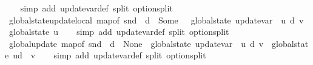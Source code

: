 \begin{isabellebody}
%
\isadelimproof
\ \ %
\endisadelimproof
%
\isatagproof
{}\isamarkupfalse%
\ {\isacharparenleft}{\kern0pt}simp\ add{\isacharcolon}{\kern0pt}\ update{\isacharunderscore}{\kern0pt}var{\isacharunderscore}{\kern0pt}def\ split{\isacharcolon}{\kern0pt}\ option{\isachardot}{\kern0pt}split{\isacharparenright}{\kern0pt}%
\endisatagproof
{\isafoldproof}%
%
\isadelimproof
\isanewline
%
\endisadelimproof
\isanewline
{}\isamarkupfalse%
\ global{\isacharunderscore}{\kern0pt}state{\isacharunderscore}{\kern0pt}update{\isacharunderscore}{\kern0pt}local{\isacharcolon}{\kern0pt}\ {\isachardoublequoteopen}map{\isacharunderscore}{\kern0pt}of\ {\isacharparenleft}{\kern0pt}snd\ {\isasymLambda}{\isacharparenright}{\kern0pt}\ d\ {\isacharequal}{\kern0pt}\ Some\ {\isasymtau}\ {\isasymLongrightarrow}\ global{\isacharunderscore}{\kern0pt}state\ {\isacharparenleft}{\kern0pt}update{\isacharunderscore}{\kern0pt}var\ {\isasymLambda}\ u\ d\ v{\isacharparenright}{\kern0pt}\ {\isacharequal}{\kern0pt}\ global{\isacharunderscore}{\kern0pt}state\ u{\isachardoublequoteclose}\isanewline
%
\isadelimproof
\ \ %
\endisadelimproof
%
\isatagproof
{}\isamarkupfalse%
\ {\isacharparenleft}{\kern0pt}simp\ add{\isacharcolon}{\kern0pt}\ update{\isacharunderscore}{\kern0pt}var{\isacharunderscore}{\kern0pt}def\ split{\isacharcolon}{\kern0pt}\ option{\isachardot}{\kern0pt}split{\isacharparenright}{\kern0pt}%
\endisatagproof
{\isafoldproof}%
%
\isadelimproof
\isanewline
%
\endisadelimproof
\isanewline
{}\isamarkupfalse%
\ global{\isacharunderscore}{\kern0pt}update{\isacharcolon}{\kern0pt}\ {\isachardoublequoteopen}map{\isacharunderscore}{\kern0pt}of\ {\isacharparenleft}{\kern0pt}snd\ {\isasymLambda}{\isacharparenright}{\kern0pt}\ d\ {\isacharequal}{\kern0pt}\ None\ {\isasymLongrightarrow}\ {\isacharparenleft}{\kern0pt}global{\isacharunderscore}{\kern0pt}state\ {\isacharparenleft}{\kern0pt}update{\isacharunderscore}{\kern0pt}var\ {\isasymLambda}\ u\ d\ v{\isacharparenright}{\kern0pt}{\isacharparenright}{\kern0pt}\ {\isacharequal}{\kern0pt}\ {\isacharparenleft}{\kern0pt}global{\isacharunderscore}{\kern0pt}state\ u{\isacharparenright}{\kern0pt}{\isacharparenleft}{\kern0pt}d\ {\isasymmapsto}\ v{\isacharparenright}{\kern0pt}{\isachardoublequoteclose}\isanewline
%
\isadelimproof
\ \ %
\endisadelimproof
%
\isatagproof
{}\isamarkupfalse%
\ {\isacharparenleft}{\kern0pt}simp\ add{\isacharcolon}{\kern0pt}\ update{\isacharunderscore}{\kern0pt}var{\isacharunderscore}{\kern0pt}def\ split{\isacharcolon}{\kern0pt}\ option{\isachardot}{\kern0pt}split{\isacharparenright}{\kern0pt}%

\end{isabellebody}
